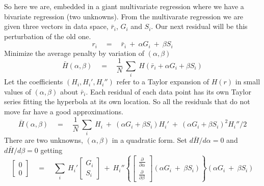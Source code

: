 \par
So here we are, embedded in a giant multivariate regression where
we have a bivariate regression (two unknowns).
From the multivarate regression we are given three vectors in data space,
$\bar r_i$, $G_i$ and $S_i$.
Our next residual will be this perturbation of the old one.
\begin{equation}
r_i \quad=\quad \bar r_i \ +\   \alpha G_i \ +\ \beta S_i
\end{equation}
Minimize the average penalty by variation of $(\alpha,\beta)$ 
\begin{equation}
\bar H(\alpha,\beta) \quad=\quad
\frac{1}{N} \ 
\sum_i \ H (\bar r_i+\alpha G_i +\beta S_i)
\end{equation}
Let the coefficients $(H_i,H_i',H_i'')$ refer to a Taylor expansion of $H(r)$
in small values of $(\alpha,\beta)$
about $\bar r_i$.
Each residual of each data point
has its own Taylor series fitting the hyperbola at its own location.
So all the residuals that do not move far have a good approximations.
\begin{equation}
\bar H(\alpha,\beta) \quad=\quad
\frac{1}{N} \ 
\sum_i \ H_i\ +\ (\alpha G_i +\beta S_i)H_i'\ +\  (\alpha G_i +\beta S_i)^2 H_i''/2
\end{equation}
There are two unknowns, $(\alpha,\beta)$ in a quadratic form.
Set $d\bar H/d\alpha=0$ and $d\bar H/d\beta=0$ getting
\begin{equation}
\left[
\begin{array}{c}
0 \\ 0
\end{array}
\right]
\quad=\quad
\sum_i \ 
H_i' 
	\left[
	\begin{array}{c} G_i \\ S_i  \end{array}
	\right]
\ +\ 
H_i''
\left\{
	\left[
	\begin{array}{c}
	       \frac{\partial}{\partial\alpha}
		\\  
  	       \frac{\partial}{\partial\beta}  
	\end{array}
	\right]
	(\alpha G_i \ +\ \beta S_i)
\right\}
       (\alpha G_i \ +\ \beta S_i)
\end{equation}

